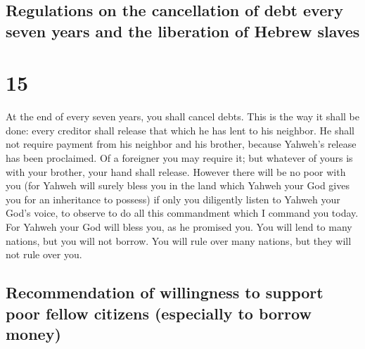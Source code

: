 \begin{paracol}{2}
\switchcolumn
\begin{otherlanguage}{english}

\hypertarget{regulations-on-the-cancellation-of-debt-every-seven-years-and-the-liberation-of-hebrew-slaves}{%
\subsection{Regulations on the cancellation of debt every seven years
and the liberation of Hebrew
slaves}\label{regulations-on-the-cancellation-of-debt-every-seven-years-and-the-liberation-of-hebrew-slaves}}

\hypertarget{section-29}{%
\section{15}\label{section-29}}

 At the end of every seven years, you shall cancel debts.
 This is the way it shall be done: every creditor shall
release that which he has lent to his neighbor. He shall not require
payment from his neighbor and his brother, because Yahweh's release has
been proclaimed.  Of a foreigner you may require it; but
whatever of yours is with your brother, your hand shall release.
 However there will be no poor with you (for Yahweh will
surely bless you in the land which Yahweh your God gives you for an
inheritance to possess)  if only you diligently listen to
Yahweh your God's voice, to observe to do all this commandment which I
command you today.  For Yahweh your God will bless you, as
he promised you. You will lend to many nations, but you will not borrow.
You will rule over many nations, but they will not rule over you.

\hypertarget{recommendation-of-willingness-to-support-poor-fellow-citizens-especially-to-borrow-money}{%
\subsection{Recommendation of willingness to support poor fellow
citizens (especially to borrow
money)}\label{recommendation-of-willingness-to-support-poor-fellow-citizens-especially-to-borrow-money}}


\end{otherlanguage}
\end{paracol}
